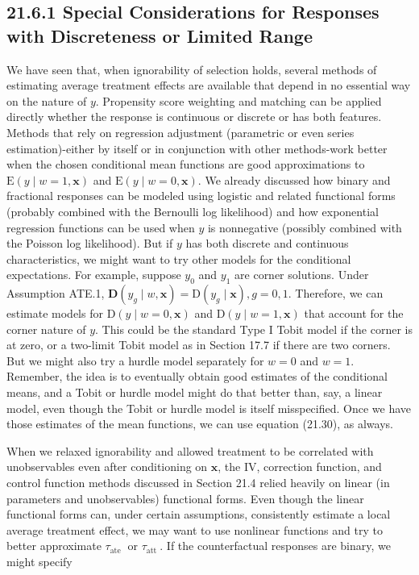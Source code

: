 \documentclass[10pt]{article}
\begin{document}
\subsection*{21.6.1 Special Considerations for Responses with Discreteness or Limited Range}
We have seen that, when ignorability of selection holds, several methods of estimating average treatment effects are available that depend in no essential way on the nature of $y$. Propensity score weighting and matching can be applied directly whether the response is continuous or discrete or has both features. Methods that rely on regression adjustment (parametric or even series estimation)-either by itself or in conjunction with other methods-work better when the chosen conditional mean functions are good approximations to $\mathrm{E}(y \mid w=1, \mathbf{x})$ and $\mathrm{E}(y \mid w=0, \mathbf{x})$. We already discussed how binary and fractional responses can be modeled using logistic and related functional forms (probably combined with the Bernoulli log likelihood) and how exponential regression functions can be used when $y$ is nonnegative (possibly combined with the Poisson log likelihood). But if $y$ has both discrete and continuous characteristics, we might want to try other models for the conditional expectations. For example, suppose $y_{0}$ and $y_{1}$ are corner solutions. Under Assumption ATE.1, $\mathbf{D}\left(y_{g} \mid w, \mathbf{x}\right)=\mathrm{D}\left(y_{g} \mid \mathbf{x}\right), g=0,1$. Therefore, we can estimate models for $\mathrm{D}(y \mid w=0, \mathbf{x})$ and $\mathrm{D}(y \mid w=1, \mathbf{x})$ that account for the corner nature of $y$. This could be the standard Type I Tobit model if the corner is at zero, or a two-limit Tobit model as in Section 17.7 if there are two corners. But we might also try a hurdle model separately for $w=0$ and $w=1$. Remember, the idea is to eventually obtain good estimates of the conditional means, and a Tobit or hurdle model might do that better than, say, a linear model, even though the Tobit or hurdle model is itself misspecified. Once we have those estimates of the mean functions, we can use equation (21.30), as always.

When we relaxed ignorability and allowed treatment to be correlated with unobservables even after conditioning on $\mathbf{x}$, the IV, correction function, and control function methods discussed in Section 21.4 relied heavily on linear (in parameters and unobservables) functional forms. Even though the linear functional forms can, under certain assumptions, consistently estimate a local average treatment effect, we may want to use nonlinear functions and try to better approximate $\tau_{\text {ate }}$ or $\tau_{\text {att }}$. If the counterfactual responses are binary, we might specify
\end{document}
